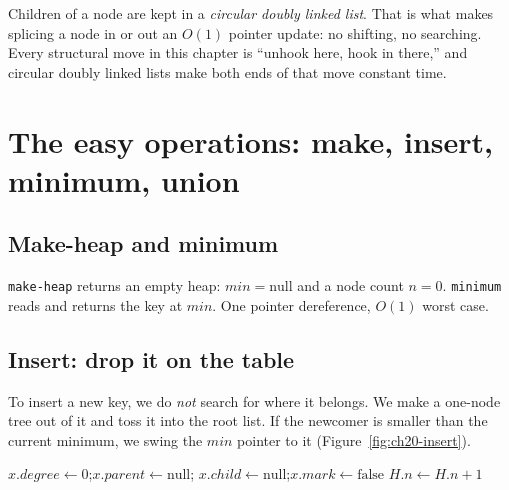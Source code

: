 \begin{focusbox}
Children of a node are kept in a \emph{circular doubly linked list}. That is what
makes splicing a node in or out an $O(1)$ pointer update: no shifting, no
searching. Every structural move in this chapter is ``unhook here, hook in
there,'' and circular doubly linked lists make both ends of that move constant
time.
\end{focusbox}

\section{The easy operations: make, insert, minimum, union}

\subsection{Make-heap and minimum}

\lstinline|make-heap| returns an empty heap: $\mathit{min} = \text{null}$ and a
node count $n = 0$. 
\lstinline|minimum| reads and returns the key at $\mathit{min}$. One pointer
dereference, $O(1)$ worst case.

\subsection{Insert: drop it on the table}

To insert a new key, we do \emph{not} search for where it belongs.
We make a one-node tree out of it and toss it into the root list.
If the newcomer is smaller than the current minimum, we swing the $\mathit{min}$ pointer to it (Figure~\ref{fig:ch20-insert}).

\begin{algorithm}[H]
\caption{\textsc{FibHeap-Insert}($H$, $x$)}
$x.\mathit{degree} \gets 0$;\quad $x.\mathit{parent} \gets \text{null}$;\quad
$x.\mathit{child} \gets \text{null}$;\quad $x.\mathit{mark} \gets \text{false}$\;
$H.n \gets H.n + 1$\;
\end{algorithm}

